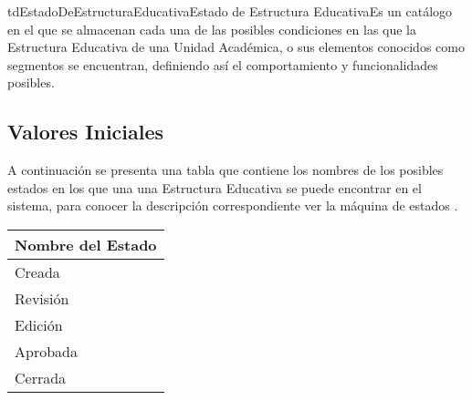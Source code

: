 \begin{TipoDeDato}{tdEstadoDeEstructuraEducativa}{Estado de Estructura Educativa}{Es un catálogo en el que se almacenan cada una de las posibles condiciones en las que la Estructura Educativa de una Unidad Acad\'emica, o sus elementos conocidos como segmentos se encuentran, definiendo así el comportamiento y funcionalidades posibles.}
	
	\begin{tdAtributos}
	\end{tdAtributos}
	
	\subsection{Valores Iniciales}
	
	 A continuación se presenta una tabla que contiene los nombres de los posibles estados en los que una una Estructura Educativa se puede encontrar en el sistema, para conocer la descripción correspondiente ver la máquina de estados .\cdtEmpty
	\begin{longtable}{| p{}|}
	 			\rowcolor{colorPrincipal}
	 			\bf \color{white} Nombre del Estado\\
	 			\hline
	 				Creada \\
	 				\hline
	 				Revisión\\
	 				\hline
	 				Edición \\
	 				\hline
	 				Aprobada\\
	 				\hline
	 				Cerrada\\
	 			\hline
	 \end{longtable}
	
\end{TipoDeDato}

